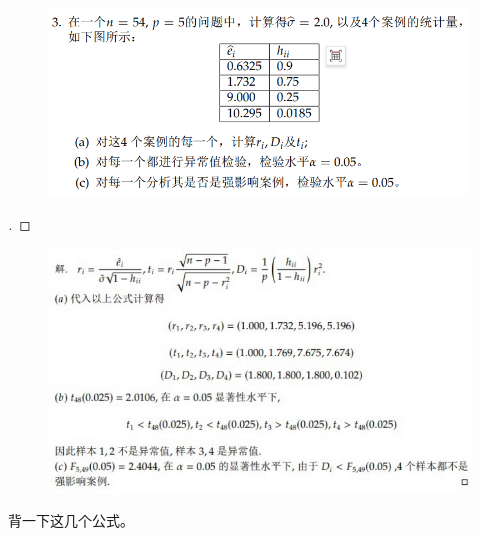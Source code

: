 \documentclass[cn,hazy,green,12pt,normal]{elegantnote}
\numberwithin{equation}{section}
\numberwithin{subsection}{section}
\begin{document}
\begin{homework}
\end{homework}
    \begin{figure}[!htbp]
        \centering
        \includegraphics[width=30em]{image/hw3_plt3.png}
    \end{figure}

\begin{proof}[\solutionname]
    
\end{proof}
    \begin{figure}[!htbp]
        \centering
        \includegraphics[width=40em]{image/hw3_plt5.png}
    \end{figure}
\begin{note}
背一下这几个公式。    
\end{note}
\newpage
\end{document}
